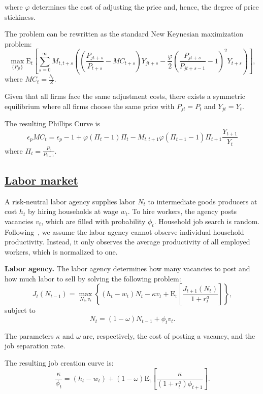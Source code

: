 \documentclass{econsocart}
\begin{document}
where $\varphi$ determines the cost of adjusting the price and, hence, the degree of price stickiness.

The problem can be rewritten as the standard New Keynesian maximization problem:
\[
  \max_{\{P_{jt}\}} \mathrm{E}_{t}\left[\sum_{s=0}^{\infty}  M_{t,t+s} \left( \left( \frac{P_{jt+s}}{P_{t+s}} - MC_{t+s}\right)Y_{jt+s} -  \frac{\varphi}{2}{\left( \frac{P_{jt+s}}{P_{jt+s-1}} - 1\right)}^{2} Y_{t+s} \right)\right],
\]
where $MC_{t} = \frac{h_{t}}{Z}$.

Given that all firms face the same adjustment costs, there exists a symmetric equilibrium where all firms choose the same price with $P_{jt}=P_{t}$ and $Y_{jt}=Y_{t}$.

The resulting Phillips Curve is
\[
  \epsilon_{p} MC_{t} = \epsilon_{p} - 1 + \varphi ( \Pi_{t} -1) \Pi_{t} - M_{t,t+1} \varphi (\Pi_{t+1} -1 ) \Pi_{t+1} \frac{Y_{t+1}}{Y_{t}}
\]
where $\Pi_{t} = \frac{P_{t}}{P_{t+1}}$.

\subsection{\href{https://econ-ark.github.io/HAFiscal/\#sec:hank-labor-market}{Labor market}}\whenintegrated{\label{sec:hank-labor-market}}

A risk-neutral labor agency supplies labor \( N_t \) to intermediate goods producers at cost \( h_t \) by hiring households at wage \( w_t \). To hire workers, the agency posts vacancies \( v_t \), which are filled with probability \( \phi_t \). Household job search is random. Following~\cite{Bardoczy2021}, we assume the labor agency cannot observe individual household productivity. Instead, it only observes the average productivity of all employed workers, which is normalized to one.

\textbf{Labor agency.} The labor agency determines how many vacancies to post and how much labor to sell by solving the following problem:
\[
  J_{t}(N_{t-1})  = \max_{N_{t},v_{t}} \left\{( h_{t} - w_{t}) N_{t}- \kappa v_{t} + \mathrm{E_{t}}\left[ \frac{J_{t+1}(N_{t})}{1 + r^{a}_{t}}\right]\right\},
\]
subject to
\[
  N_{t} = (1-\omega)N_{t-1} + \phi_{t} v_{t}.
\]

The parameters $\kappa$ and $\omega$ are, respectively, the cost of posting a vacancy, and the job separation rate.

The resulting job creation curve is:
\[
  \frac{\kappa}{\phi_{t}}  = (h_{t} - w_{t})+  (1-\omega)\mathrm{E_{t}}\left[   \frac{\kappa}{(1+r^{a}_{t}) \phi_{t+1}} \right].
\]
\end{document}
